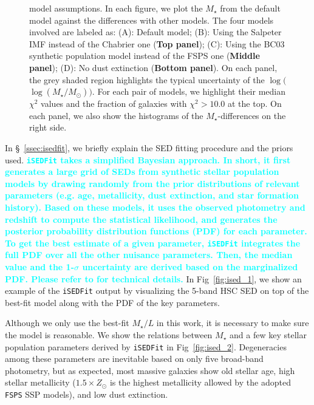 \documentclass[a4paper,fleqn,usenatbib]{mnras}
\def\mstar{{$M_{\star}$}}
\def\logms{{$\log (M_{\star}/M_{\odot})$}}
\def\m2l{{$M_{\star}/L$}}
\newcommand{\song}[1]{\textcolor{cyan}{\textbf{#1}}}
\begin{document}
\begin{figure}
\begin{center}
{            model assumptions. 
            In each figure, we plot the \mstar{} from the default model against the
            differences with other models. 
            The four models involved are labeled as: 
            (A): Default model; 
            (B): Using the Salpeter IMF instead of the Chabrier one 
                (\textbf{Top panel});
            (C): Using the BC03 synthetic population model instead of the FSPS one
                (\textbf{Middle panel});
            (D): No dust extinction (\textbf{Bottom panel}). 
            On each panel, the grey shaded region highlights the typical uncertainty 
            of the $\log($\logms{}$)$.            
            For each pair of models, we highlight their median $\chi^{2}$ values and 
            the fraction of galaxies with $\chi^{2} > 10.0$ at the top. 
            On each panel, we also show the histograms of the \mstar{}-differences on 
            the right side.
            }
        \label{fig:ised_3}
        \end{center}
    \end{figure}

 
    In \S~\ref{ssec:isedfit}, we briefly explain the SED fitting procedure and 
    the priors used.   
    \song{
    \texttt{iSEDFit} takes a simplified Bayesian approach. 
    In short, it first generates a large grid of SEDs from synthetic stellar 
    population models by drawing randomly from the prior distributions of relevant
    parameters (e.g. age, metallicity, dust extinction, and star formation history).
    Based on these models, it uses the observed photometry and redshift to compute 
    the statistical likelihood, and generates the posterior probability distribution 
    functions (PDF) for each parameter.  
    To get the best estimate of a given parameter, \texttt{iSEDFit} integrates the 
    full PDF over all the other nuisance parameters.
    Then, the median value and the 1-$\sigma$ uncertainty are derived based on the 
    marginalized PDF. 
    Please refer to \citet{Moustakas13} for technical details. 
    }
    In Fig~\ref{fig:ised_1}, we show an example of the \texttt{iSEDFit} output by 
    visualizing the 5-band HSC SED on top of the best-fit model along with the PDF 
    of the key parameters.
     
    Although we only use the best-fit \m2l{} in this work, it is necessary to make 
    sure the model is reasonable. 
    We show the relations between \mstar{} and a few key stellar population parameters 
    derived by \texttt{iSEDFit} in Fig~\ref{fig:ised_2}. 
    Degeneracies among these parameters are inevitable based on only five broad-band
    photometry, but as expected, most massive galaxies show old stellar age, high
    stellar metallicity ($1.5 \times Z_{\odot}$ is the highest metallicity allowed by 
    the adopted \texttt{FSPS} SSP models), and low dust extinction.
   
\end{document}
